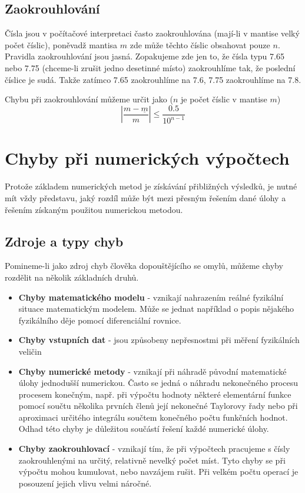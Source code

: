   \subsection{Zaokrouhlování}
    Čísla jsou v počítačové interpretaci často zaokrouhlována (mají-li v mantise velký počet
    číslic), poněvadž mantisa $m$ zde může těchto číslic obsahovat pouze $n$. Pravidla
    zaokrouhlování jsou jasná. Zopakujeme zde jen to, že čísla typu 7.65 nebo 7.75 (chceme-li
    zrušit jedno desetinné místo) zaokrouhlíme tak, že poslední číslice je sudá. Takže zatímco 7.65
    zaokrouhlíme na 7.6, 7.75 zaokrouhlíme na 7.8.

    Chybu při zaokrouhlování můžeme určit jako ($n$ je počet číslic v mantise $m$)
    \begin{equation}\label{nm:eq_err_round}
      |\frac{m-\underline{m}}{m}|\leq\frac{0.5}{10^{n-1}}
    \end{equation}  

\section{Chyby při numerických výpočtech}
  Protože základem numerických metod je získávání přibližných výsledků, je nutné mít vždy
  představu, jaký rozdíl může být mezi přesným řešením dané úlohy a řešením získaným použitou
  numerickou metodou.
  \subsection{Zdroje a typy chyb}
    Pomineme-li jako zdroj chyb člověka dopouštějícího se omylů, můžeme chyby rozdělit na několik
    základních druhů.
    \begin{itemize}
      \item \textbf{Chyby matematického modelu} - vznikají nahrazením reálné fyzikální situace
            matematickým modelem. Může se jednat například o popis nějakého fyzikálního děje pomocí
            diferenciální rovnice.
      \item \textbf{Chyby vstupních dat} - jsou způsobeny nepřesnostmi při měření fyzikálních
            veličin
      \item \textbf{Chyby numerické metody} - vznikají při náhradě původní matematické úlohy
            jednodušší numerickou. Často se jedná o náhradu nekonečného procesu procesem konečným,
            např. při výpočtu hodnoty některé elementární funkce pomocí součtu několika prvních
            členů její nekonečné Taylorovy řady nebo při aproximaci určitého integrálu souč\-tem
            konečného počtu funkčních hodnot. Odhad této chyby je důležitou součástí řešení každé
            numerické úlohy.
      \item \textbf{Chyby zaokrouhlovací} - vznikají tím, že při výpočtech pracujeme s čísly
            zaokrouhlenými na určitý, relativně nevelký počet míst. Tyto chyby se při výpočtu mohou
            kumulovat, nebo navzájem rušit. Při vel\-kém počtu operací je posouzení jejich vlivu
            velmi náročné.
    \end{itemize}
